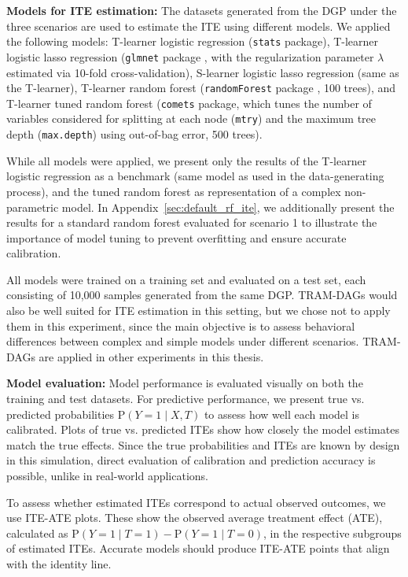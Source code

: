 \textbf{Models for ITE estimation:} The datasets generated from the DGP under the three scenarios are used to estimate the ITE using different models. We applied the following models: T-learner logistic regression (\texttt{stats} package), T-learner logistic lasso regression (\texttt{glmnet} package \citep{friedman2010}, with the regularization parameter $\lambda$ estimated via 10-fold cross-validation), S-learner logistic lasso regression (same as the T-learner), T-learner random forest (\texttt{randomForest} package \citep{breiman2001}, 100 trees), and T-learner tuned random forest (\texttt{comets} package, which tunes the number of variables considered for splitting at each node (\texttt{mtry}) and the maximum tree depth (\texttt{max.depth}) using out-of-bag error, 500 trees). 

While all models were applied, we present only the results of the T-learner logistic regression as a benchmark (same model as used in the data-generating process), and the tuned random forest as representation of a complex non-parametric model. In Appendix~\ref{sec:default_rf_ite}, we additionally present the results for a standard random forest evaluated for scenario 1 to illustrate the importance of model tuning to prevent overfitting and ensure accurate calibration.

All models were trained on a training set and evaluated on a test set, each consisting of 10,000 samples generated from the same DGP. TRAM-DAGs would also be well suited for ITE estimation in this setting, but we chose not to apply them in this experiment, since the main objective is to assess behavioral differences between complex and simple models under different scenarios. TRAM-DAGs are applied in other experiments in this thesis.



\textbf{Model evaluation:} Model performance is evaluated visually on both the training and test datasets. For predictive performance, we present true vs. predicted probabilities $\text{P}(Y = 1 \mid X, T)$ to assess how well each model is calibrated. Plots of true vs. predicted ITEs show how closely the model estimates match the true effects. Since the true probabilities and ITEs are known by design in this simulation, direct evaluation of calibration and prediction accuracy is possible, unlike in real-world applications.

To assess whether estimated ITEs correspond to actual observed outcomes, we use ITE-ATE plots. These show the observed average treatment effect (ATE), calculated as $\text{P}(Y = 1 \mid T = 1) - \text{P}(Y = 1 \mid T = 0)$, in the respective subgroups of estimated ITEs. Accurate models should produce ITE-ATE points that align with the identity line.

